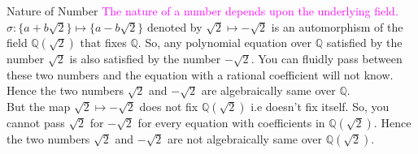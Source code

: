 \documentclass{beamer}
\begin{document}
\begin{frame}{Nature of Number}
  \textcolor{magenta}{The nature of a number depends upon the underlying field.}\\
  \(\sigma: \{a + b\sqrt{2}\} \mapsto \{a - b\sqrt{2}\} \) denoted by \(\sqrt{2} \longmapsto -\sqrt{2}\) is an automorphism of the field \(\mathbb{Q}(\sqrt{2})\) that fixes \(\mathbb{Q}\). So,  any polynomial equation over \(\mathbb{Q}\) satisfied by the number \(\sqrt{2}\) is also satisfied by the number \(-\sqrt{2}\). You can fluidly pass between these two numbers and the equation with a rational coefficient will not know. \textcolor{green!50!black}{Hence the two numbers \(\sqrt{2}\) and \(-\sqrt{2}\) are algebraically same over \(\mathbb{Q}\).}\\[4mm]

But the map \(\sqrt{2} \longmapsto -\sqrt{2}\) does not fix  \(\mathbb{Q}(\sqrt{2})\) i.e doesn't fix itself. So, you cannot pass \(\sqrt{2}\) for \(-\sqrt{2}\) for every equation with coefficients in \(\mathbb{Q}(\sqrt{2})\). \textcolor{green!50!black}{Hence the two numbers \(\sqrt{2}\) and \(-\sqrt{2}\) are not algebraically same over \(\mathbb{Q}(\sqrt{2})\).}
\vspace{2mm}

\begin{figure}[h]
  \centering
  \end{figure}
\end{frame}
\end{document}
